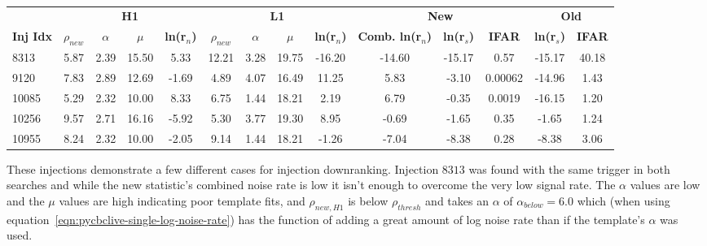 \begin{table}[ht]
    \centering
    \small
    \setlength{\tabcolsep}{4pt}
    \begin{adjustbox}{minipage=\linewidth-0cm, margin=-5cm 0pt 0pt 0cm}
    \begin{tabular}{lccccccccccccc}
        \toprule
        & \multicolumn{4}{c}{\textbf{H1}} & \multicolumn{4}{c}{\textbf{L1}} & \multicolumn{3}{c}{\textbf{New}} & \multicolumn{2}{c}{\textbf{Old}} \\
        \cmidrule(lr){2-5} \cmidrule(lr){6-9} \cmidrule(lr){10-12} \cmidrule(lr){13-14}
        \textbf{Inj Idx} & \textbf{$\rho_{new}$} & \textbf{$\alpha$} & \textbf{$\mu$} & \textbf{ln(r$_n$)} & \textbf{$\rho_{new}$} & \textbf{$\alpha$} & \textbf{$\mu$} & \textbf{ln(r$_n$)} & \textbf{Comb. ln(r$_n$)} & \textbf{ln(r$_s$)} & \textbf{IFAR} & \textbf{ln(r$_s$)} & \textbf{IFAR} \\
        \midrule
        8313 & 5.87 & 2.39 & 15.50 & 5.33 & 12.21 & 3.28 & 19.75 & -16.20 & -14.60 & -15.17 & 0.57 & -15.17 & 40.18 \\
        9120 & 7.83 & 2.89 & 12.69 & -1.69 & 4.89 & 4.07 & 16.49 & 11.25 & 5.83 & -3.10 & 0.00062 & -14.96 & 1.43 \\
        10085 & 5.29 & 2.32 & 10.00 & 8.33 & 6.75 & 1.44 & 18.21 & 2.19 & 6.79 & -0.35 & 0.0019 & -16.15 & 1.20 \\
        10256 & 9.57 & 2.71 & 16.16 & -5.92 & 5.30 & 3.77 & 19.30 & 8.95 & -0.69 & -1.65 & 0.35 & -1.65 & 1.24 \\
        10955 & 8.24 & 2.32 & 10.00 & -2.05 & 9.14 & 1.44 & 18.21 & -1.26 & -7.04 & -8.38 & 0.28 & -8.38 & 3.06 \\
        \bottomrule
    \end{tabular}
    \end{adjustbox}
    \caption{}
    \label{tab:pycbclive-bottom-right-rank-stat}
\end{table}
%
These injections demonstrate a few different cases for injection downranking. Injection $8313$ was found with the same trigger in both searches and while the new statistic's combined noise rate is low it isn't enough to overcome the very low signal rate. The 
$\alpha$ values are low and the $\mu$ values are high indicating poor template fits, and $\rho_{new, H1}$ is below $\rho_{thresh}$ and takes an $\alpha$ of $\alpha_{below} = 6.0$ which (when using equation~\ref{eqn:pycbclive-single-log-noise-rate}) has the function of adding a great amount of log noise rate than if the template's $\alpha$ was used.

